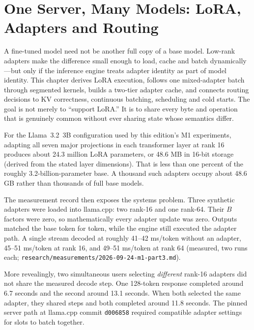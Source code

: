 \chapter{One Server, Many Models: LoRA, Adapters and Routing}\label{ch:multi-model-serving}

\begin{ChapterIntent}
A fine-tuned model need not be another full copy of a base model. Low-rank adapters
make the difference small enough to load, cache and batch dynamically---but only if
the inference engine treats adapter identity as part of model identity. This chapter
derives LoRA execution, follows one mixed-adapter batch through segmented kernels,
builds a two-tier adapter cache, and connects routing decisions to KV correctness,
continuous batching, scheduling and cold starts. The goal is not merely to ``support
LoRA.'' It is to share every byte and operation that is genuinely common without ever
sharing state whose semantics differ.
\end{ChapterIntent}


For the Llama~3.2~3B configuration used by this edition's M1 experiments, adapting all
seven major projections in each transformer layer at rank 16 produces about
24.3 million LoRA parameters, or 48.6 MB in 16-bit storage (derived from the stated
layer dimensions). That is less than one percent of the roughly 3.2-billion-parameter
base. A thousand such adapters occupy about 48.6 GB rather than thousands of full base
models.

The measurement record then exposes the systems problem. Three synthetic adapters
were loaded into llama.cpp: two rank-16 and one rank-64. Their $B$ factors were zero,
so mathematically every adapter update was zero. Outputs matched the base token for
token, while the engine still executed the adapter path. A single stream decoded at
roughly 41--42 ms/token without an adapter, 45--51 ms/token at rank 16, and
49--51 ms/token at rank 64 (measured, two runs each;
\texttt{research/measurements/2026-09-24-m1-part3.md}).

More revealingly, two simultaneous users selecting \emph{different} rank-16 adapters
did not share the measured decode step. One 128-token response completed around
6.7 seconds and the second around 13.1 seconds. When both selected the same adapter,
they shared steps and both completed around 11.8 seconds. The pinned server path at
llama.cpp commit \texttt{d006858} required compatible adapter settings for slots to
batch together.

